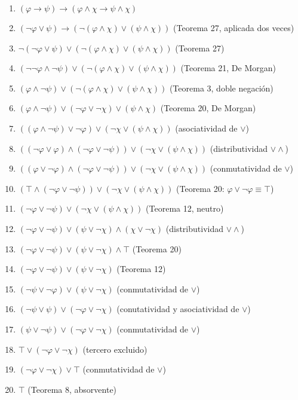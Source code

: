 \begin{enumerate}
    \item $(\varphi \rightarrow \psi) \rightarrow (\varphi \land \chi \rightarrow \psi \land \chi)$
    \item $(\neg\varphi \lor \psi) \rightarrow (\neg(\varphi \land \chi) \lor (\psi \land \chi))$ \hfill (Teorema 27, aplicada dos veces)
    \item $\neg(\neg\varphi \lor \psi) \lor (\neg(\varphi \land \chi) \lor (\psi \land \chi))$ \hfill (Teorema 27)
    \item $(\neg\neg\varphi \land \neg\psi) \lor (\neg(\varphi \land \chi) \lor (\psi \land \chi))$ \hfill (Teorema 21, De Morgan)
    \item $(\varphi \land \neg\psi) \lor (\neg(\varphi \land \chi) \lor (\psi \land \chi))$ \hfill (Teorema 3, doble negación)
    \item $(\varphi \land \neg\psi) \lor (\neg\varphi \lor \neg\chi) \lor (\psi \land \chi)$ \hfill (Teorema 20, De Morgan)
    \item $((\varphi \land \neg\psi) \lor \neg\varphi) \lor (\neg\chi \lor (\psi \land \chi))$ \hfill (asociatividad de $\lor$)
    \item $((\neg\varphi \lor \varphi) \land (\neg\varphi \lor \neg\psi)) \lor (\neg\chi \lor (\psi \land \chi))$ \hfill (distributividad $\lor\land$)
    \item $((\varphi \lor \neg\varphi) \land (\neg\varphi \lor \neg\psi)) \lor (\neg\chi \lor (\psi \land \chi))$ \hfill (conmutatividad de $\lor$)
    \item $(\top \land (\neg\varphi \lor \neg\psi)) \lor (\neg\chi \lor (\psi \land \chi))$ \hfill (Teorema 20: $\varphi \lor \neg\varphi \equiv \top$)
    \item $(\neg\varphi \lor \neg\psi) \lor (\neg\chi \lor (\psi \land \chi))$ \hfill (Teorema 12, neutro)
    \item $(\neg\varphi \lor \neg\psi) \lor (\psi \lor \neg\chi) \land (\chi \lor \neg\chi)$ \hfill (distributividad $\lor\land$)
    \item $(\neg\varphi \lor \neg\psi) \lor (\psi \lor \neg\chi) \land \top$ \hfill (Teorema 20)
    \item $(\neg\varphi \lor \neg\psi) \lor (\psi \lor \neg\chi)$ \hfill (Teorema 12)
    \item $(\neg\psi \lor \neg\varphi) \lor (\psi \lor \neg\chi)$ \hfill (conmutatividad de $\lor$)
    \item $(\neg\psi \lor \psi) \lor (\neg\varphi \lor \neg\chi)$ \hfill (conutatividad y asociatividad de $\lor$)
    \item $(\psi \lor \neg\psi) \lor (\neg\varphi \lor \neg\chi)$ \hfill (conmutatividad de $\lor$)
    \item $\top \lor (\neg\varphi \lor \neg\chi)$ \hfill (tercero excluido)
    \item $(\neg\varphi \lor \neg\chi) \lor \top$ \hfill (conmutatividad de $\lor$)
    \item $\top$ \hfill (Teorema 8, absorvente)
\end{enumerate}

